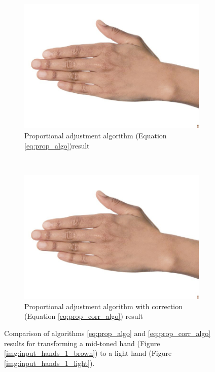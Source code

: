 \begin{figure}[H]
    \centering
    \begin{subfigure}[b]{0.40\textwidth}
        \includegraphics[width=\textwidth]{../rc_test/outputs/20170516_proportional_test/hand_brown_to_hand_light.jpg}
        \caption{Proportional adjustment algorithm (Equation \ref{eq:prop_algo})result}
    \end{subfigure}
    ~
    \begin{subfigure}[b]{0.40\textwidth}
        \includegraphics[width=\textwidth]{../rc_test/outputs/20170522_proportional_corrected_test_alpha1p1/hand_brown_to_hand_light.jpg}
        \caption{Proportional adjustment algorithm with correction (Equation \ref{eq:prop_corr_algo}) result}
    \end{subfigure}
    \caption{Comparison of algorithms \ref{eq:prop_algo} and \ref{eq:prop_corr_algo} results for transforming a mid-toned hand (Figure \ref{img:input_hands_1_brown}) to a light hand (Figure \ref{img:input_hands_1_light}).\label{img:compare_dark_spot}}
\end{figure}

